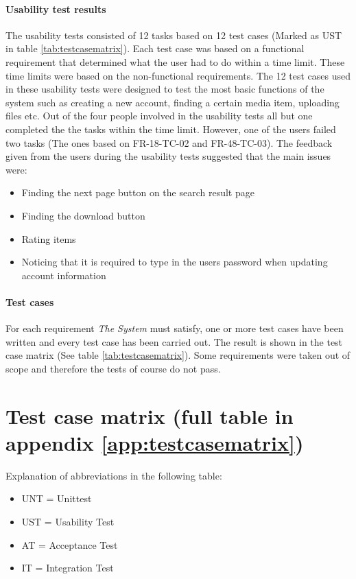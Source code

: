 \documentclass[../report.tex]{subfiles}
\begin{document}
\paragraph{Usability test results}
The usability tests consisted of 12 tasks based on 12 test cases (Marked as UST in table \ref{tab:testcasematrix}). Each test case was based on a functional requirement that determined what the user had to do within a time limit. These time limits were based on the non-functional requirements. The 12 test cases used in these usability tests were designed to test the most basic functions of the system such as creating a new account, finding a certain media item, uploading files etc. 
Out of the four people involved in the usability tests all but one completed the the tasks within the time limit. However, one of the users failed two tasks (The ones based on FR-18-TC-02 and FR-48-TC-03). The feedback given from the users during the usability tests suggested that the main issues were:
\begin{itemize}
\item Finding the next page button on the search result page
\item Finding the download button
\item Rating items
\item Noticing that it is required to type in the users password when updating account information
\end{itemize} 

\paragraph{Test cases}
For each requirement \textit{The System} must satisfy, one or more test cases have been written and every test case has been carried out. The result is shown in the test case matrix (See table \ref{tab:testcasematrix}). Some requirements were taken out of scope and therefore the tests of course do not pass.


\section{Test case matrix (full table in appendix \ref{app:testcasematrix})}

Explanation of abbreviations in the following table:
\begin{itemize}
\item UNT = Unittest
\item UST = Usability Test
\item AT = Acceptance Test
\item IT = Integration Test
\end{itemize}
\end{document}
